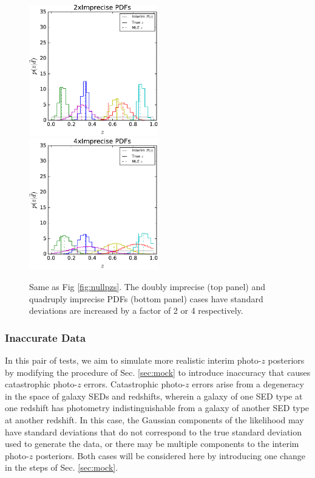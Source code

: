 \documentclass[preprint]{aastex}
\begin{document}
\begin{figure}
\includegraphics[width=0.5\textwidth]{figs/sig2/samplepzs.pdf}\\
\includegraphics[width=0.5\textwidth]{figs/sig4/samplepzs.pdf}
\caption{Same as Fig \ref{fig:nullpzs}.  The doubly imprecise (top panel) and 
quadruply imprecise PDFs (bottom panel) cases have standard deviations are 
increased by a factor of 2 or 4 respectively.}
\label{fig:sigspzs}
\end{figure}

\subsubsection{Inaccurate Data}
\label{sec:inaccuracy}

In this pair of tests, we aim to simulate more realistic interim photo-$z$ 
posteriors by modifying the procedure of Sec. \ref{sec:mock} to introduce 
inaccuracy that causes catastrophic photo-$z$ errors.  Catastrophic photo-$z$ 
errors arise from a degeneracy in the space of galaxy SEDs and redshifts, 
wherein a galaxy of one SED type at one redshift has photometry 
indistinguishable from a galaxy of another SED type at another redshift.  In 
this case, the Gaussian components of the likelihood may have standard 
deviations that do not correspond to the true standard deviation used to 
generate the data, or there may be multiple components to the interim photo-$z$ 
posteriors.  Both cases will be considered here by introducing one change in 
the steps of Sec. \ref{sec:mock}.  
\end{document}
